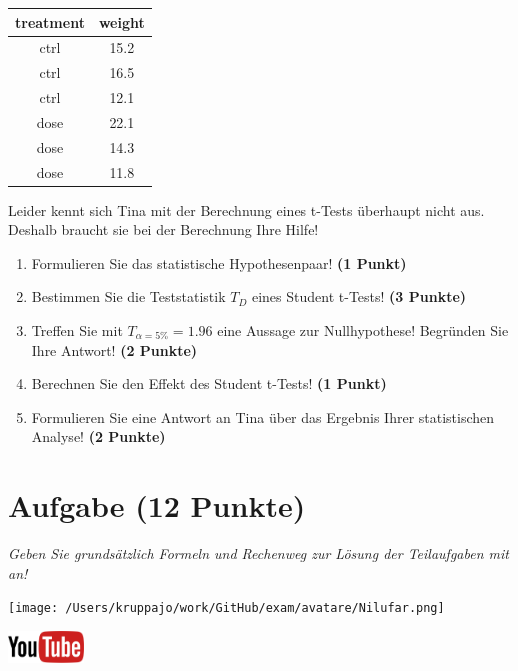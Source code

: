 \documentclass[a4paper, 9pt]{scrartcl}\usepackage[]{graphicx}\usepackage[]{xcolor}
\begin{document}
\begin{table}[!h]
\centering
\begin{tabular}{cc}
\toprule
treatment & weight\\
\midrule
ctrl & 15.2\\
ctrl & 16.5\\
ctrl & 12.1\\
dose & 22.1\\
dose & 14.3\\
\addlinespace
dose & 11.8\\
\bottomrule
\end{tabular}
\end{table}



Leider kennt sich Tina mit der Berechnung eines t-Tests überhaupt nicht aus. Deshalb braucht sie bei der Berechnung Ihre Hilfe!

\begin{enumerate}
  \item Formulieren Sie das statistische Hypothesenpaar! \textbf{(1 Punkt)}
  \item Bestimmen Sie die Teststatistik $T_{D}$ eines Student t-Tests! \textbf{(3 Punkte)}
  \item Treffen Sie mit $T_{\alpha = 5\%} = 1.96$ eine Aussage zur Nullhypothese! Begründen Sie Ihre Antwort! \textbf{(2 Punkte)}
  \item Berechnen Sie den Effekt des Student t-Tests! \textbf{(1 Punkt)}
  \item Formulieren Sie eine Antwort an Tina über das Ergebnis Ihrer statistischen Analyse! \textbf{(2 Punkte)}
\end{enumerate} 
\clearpage

\section{Aufgabe \hfill (12 Punkte)}

\textit{Geben Sie grundsätzlich Formeln und Rechenweg zur Lösung der Teilaufgaben mit an!} \\[1Ex]
 

 
\begin{minipage}[t]{0.5\textwidth}
\texttt{[image: /Users/kruppajo/work/GitHub/exam/avatare/Nilufar.png]}
\end{minipage}
\begin{minipage}[t]{0.5\textwidth}
\hfill
\href{https://youtu.be/Cq_rF_z4xOk}{\includegraphics[width = 2cm]{img/youtube}}\\[1Ex]
\end{minipage}
\vspace{1ex}
\end{document}

